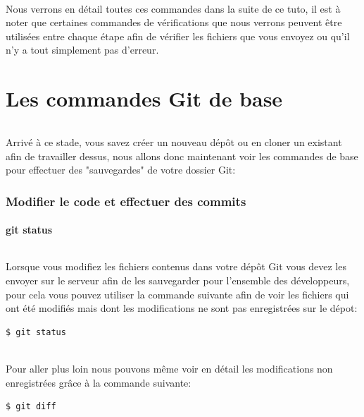 \documentclass[french, a4paper, 12pt, titlepage]{article}
\begin{document}
\paragraph{}Nous verrons en détail toutes ces commandes dans la suite de ce tuto, il est à noter que certaines commandes de vérifications que nous verrons peuvent être utilisées entre chaque étape afin de vérifier les fichiers que vous envoyez ou qu'il n'y a tout simplement pas d'erreur.

\newpage
\part{Les commandes Git de base}
\paragraph{}Arrivé à ce stade, vous savez créer un nouveau dépôt ou en cloner un existant afin de travailler dessus, nous allons donc maintenant voir les commandes de base pour effectuer des "sauvegardes" de votre dossier Git:

\section{Modifier le code et effectuer des commits}
\subsection{git status}
\paragraph{}Lorsque vous modifiez les fichiers contenus dans votre dépôt Git vous devez les envoyer sur le serveur afin de les sauvegarder pour l'ensemble des développeurs, pour cela vous pouvez utiliser la commande suivante afin de voir les fichiers qui ont été modifiés mais dont les modifications ne sont pas enregistrées sur le dépot:
\begin{lstlisting}
$ git status
\end{lstlisting}

\paragraph{}Pour aller plus loin nous pouvons même voir en détail les modifications non enregistrées grâce à la commande suivante:
\begin{lstlisting}
$ git diff
\end{lstlisting}
\end{document}
